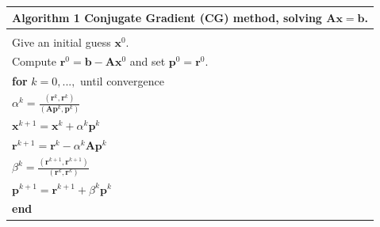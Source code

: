\documentclass[12pt]{article}
\begin{document}
\begin{table}[!h]
\begin{tabular}{ |l| } 
\hline
  \textbf{Algorithm 1} Conjugate Gradient (CG) method, solving $\mathbf{A}\mathbf{x}=\mathbf{b}$.\\
  \hline
 \hline
\\
Give an initial guess $\mathbf{x}^0$. \\Compute $\mathbf{r}^0=\mathbf{b}-\mathbf{A}\mathbf{x}^0$ and set $\mathbf{p}^0=\mathbf{r}^0$.\\

\hspace{0.5cm}\textbf{for} $k=0,...,$ until convergence\\
 \hspace{1cm} $\alpha^k=\frac{(\mathbf{r}^{k},\mathbf{r}^{k})}{(\mathbf{A}\mathbf{p}^k,\mathbf{p}^k)}$\\
\hspace{1cm} $\mathbf{x}^{k+1}=\mathbf{x}^k+\alpha^k\mathbf{p}^k$\\
\hspace{1cm}$\mathbf{r}^{k+1}=\mathbf{r}^k-\alpha^k\mathbf{A}\mathbf{p}^k$\\
\hspace{1cm}$ \beta^k=\frac{(\mathbf{r}^{k+1},\mathbf{r}^{k+1})}{(\mathbf{r}^k,\mathbf{r}^k)}$\\
\hspace{1cm}$\mathbf{p}^{k+1}=\mathbf{r}^{k+1}+\beta^k\mathbf{p}^k$\\
\hspace{0.5cm}\textbf{end}\\
\hline
\end{tabular}
\end{table}
 
\end{document}
